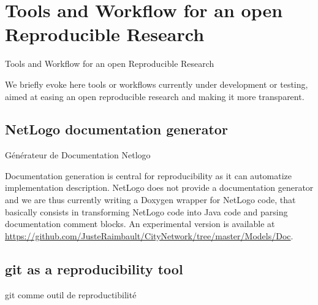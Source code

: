 



\section{Tools and Workflow for an open Reproducible Research}{Tools and Workflow for an open Reproducible Research} %

\label{app:workflow} %





%
%
%





\bigskip

We briefly evoke here tools or workflows currently under development or testing, aimed at easing an open reproducible research and making it more transparent.


\subsection{NetLogo documentation generator}{Générateur de Documentation Netlogo}

Documentation generation is central for reproducibility as it can automatize implementation description. NetLogo does not provide a documentation generator and we are thus currently writing a Doxygen wrapper for NetLogo code, that basically consists in transforming NetLogo code into Java code and parsing documentation comment blocks. An experimental version is available at \url{https://github.com/JusteRaimbault/CityNetwork/tree/master/Models/Doc}.



\subsection{git as a reproducibility tool}{git comme outil de reproductibilité}

